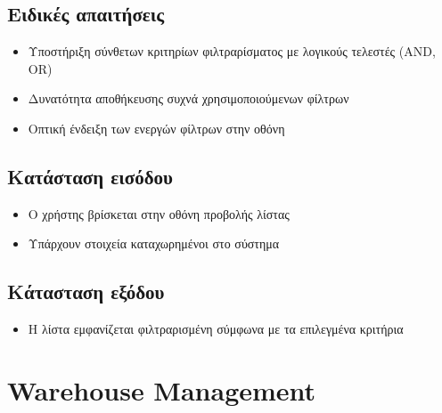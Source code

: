 \documentclass[12pt,a4paper,twoside]{book}
\begin{document}
\subsection{Ειδικές απαιτήσεις} %
\begin{itemize}
  \item Υποστήριξη σύνθετων κριτηρίων φιλτραρίσματος με λογικούς τελεστές (AND, OR)
  \item Δυνατότητα αποθήκευσης συχνά χρησιμοποιούμενων φίλτρων
  \item Οπτική ένδειξη των ενεργών φίλτρων στην οθόνη %
\end{itemize}

\subsection{Κατάσταση εισόδου} %
\begin{itemize}
  \item Ο χρήστης βρίσκεται στην οθόνη προβολής λίστας
  \item Υπάρχουν στοιχεία καταχωρημένοι στο σύστημα
\end{itemize}

\subsection{Κάτασταση εξόδου} %
\begin{itemize}
  \item Η λίστα εμφανίζεται φιλτραρισμένη σύμφωνα με τα επιλεγμένα κριτήρια
\end{itemize}

\section{Warehouse Management}
\end{document}
